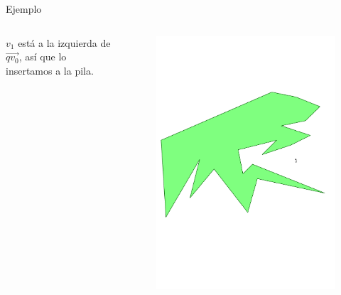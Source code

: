\documentclass[aspectratio=169,xcolor=dvipsnames, t]{beamer}
\begin{document}
\begin{frame}{Ejemplo}
  \begin{columns}
    \begin{column}{0.3\textwidth}
      \raggedright %
      $v_{1}$ está a la izquierda de $\overrightarrow{qv_{0}}$, así que lo insertamos a la pila.
    \end{column}
    \begin{column}{0.7\textwidth}
      \vspace{-2.5cm} %
      \begin{figure}
        \centering
        \includegraphics[width=1\linewidth, height=.95\textheight, page=10, keepaspectratio]{IPE/point_visibility.pdf}
      \end{figure}
    \end{column}
  \end{columns}
\end{frame}
\end{document}
